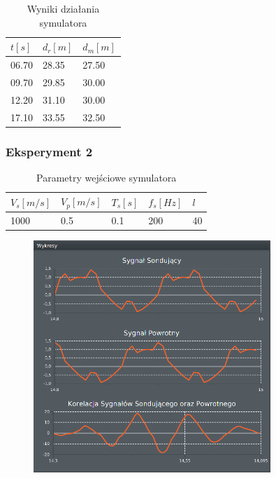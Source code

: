 \documentclass[12pt]{article}
\begin{document}
{{{\begin{table}[H]
\begin{tabular}{|l|l|l|}
                        \hline
                        $t[s]$ & $d_r[m]$ & $d_m[m]$ \\ \hline
                        06.70  & 28.35    & 27.50    \\ \hline
                        09.70  & 29.85    & 30.00    \\ \hline
                        12.20  & 31.10    & 30.00    \\ \hline
                        17.10  & 33.55    & 32.50    \\ \hline
                    \end{tabular}
                    \caption{Wyniki działania symulatora}
                \end{table}
            }
            \newpage

            \subsubsection{Eksperyment 2} {
                \begin{table}[H]
                    \centering
                    \begin{tabular}{|l|l|l|l|l|}
                        \hline
                        $V_s[m/s]$ & $V_p[m/s]$ & $T_s[s]$ & $f_s[Hz]$ & $l$ \\ \hline
                        1000       & 0.5        & 0.1      & 200       & 40 \\ \hline
                    \end{tabular}
                    \caption{Parametry wejściowe symulatora}
                \end{table}
                \begin{figure}[H]
                    \centering
                    \includegraphics[width=0.8\textwidth]{img/result/simulation/experiment2.png}

\end{figure}}}}
\end{document}

